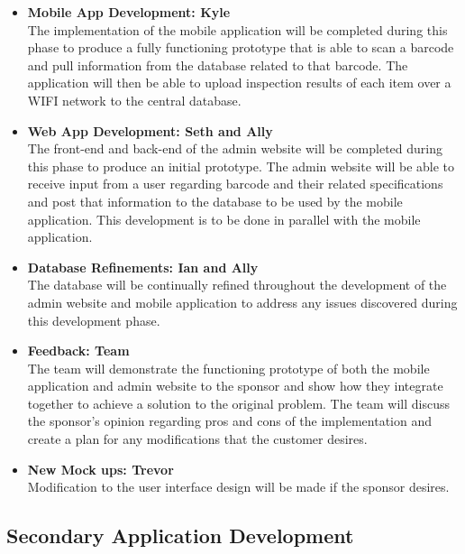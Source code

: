 \documentclass[Letter,11pt]{article}
\begin{document}
		\begin{itemize}
			\item\textbf{Mobile App Development: Kyle}\\
		The implementation of the mobile application will be completed during this phase to produce a fully functioning prototype that is able to scan a barcode and pull information from the database related to that barcode.  The application will then be able to upload inspection results of each item over a WIFI network to the central database.\\		
			\item \textbf{Web App Development: Seth and Ally}\\
			The front-end and back-end of the admin website will be completed during this phase to produce an initial prototype.  The admin website will be able to receive input from a user regarding barcode and their related specifications and post that information to the database to be used by the mobile application.  This development is to be done in parallel with the mobile application.\\

			\item\textbf{Database Refinements: Ian and Ally}\\
			The database will be continually refined throughout the development of the admin website and mobile application to address any issues discovered during this development phase.\\
			
			\item\textbf{Feedback: Team}\\
			The team will demonstrate the functioning prototype of both the mobile application and admin website to the sponsor and show how they integrate together to achieve a solution to the original problem.  The team will discuss the sponsor’s opinion regarding pros and cons of the implementation and create a plan for any modifications that the customer desires.\\
			
			\item\textbf{New Mock ups: Trevor}\\
			Modification to the user interface design will be made if the sponsor desires.

		\end{itemize}
		
	\subsection{Secondary Application Development}\label{dev2}
		
\end{document}
